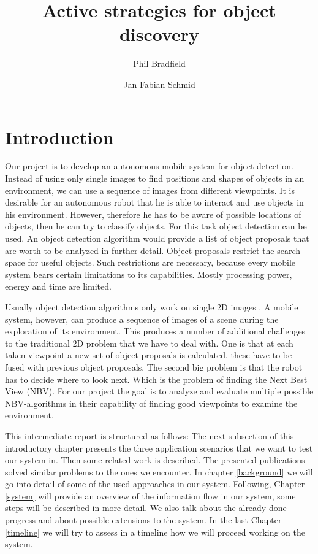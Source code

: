 \documentclass[a4paper,11pt,english]{article}
\begin{document}
\title{Active strategies for object discovery}
\author{Phil Bradfield \and Jan Fabian Schmid}
	
\maketitle 

\section{Introduction}
Our project is to develop an autonomous mobile system for object detection.
Instead of using only single images to find positions and shapes of objects in an environment, we can use a sequence of images from different viewpoints.
It is desirable for an autonomous robot that he is able to interact and use objects in his environment. However, therefore he has to be aware of possible locations of objects, then he can try to classify objects.
For this task object detection can be used. An object detection algorithm would provide a list of object proposals that are worth to be analyzed in further detail.
Object proposals restrict the search space for useful objects.
Such restrictions are necessary, because every mobile system bears certain limitations to its capabilities. 
Mostly processing power, energy and time are limited.

Usually object detection algorithms only work on single 2D images \cite{atanasov2014nonmyopic}.
A mobile system, however, can produce a sequence of images of a scene during the exploration of its environment.
This produces a number of additional challenges to the traditional 2D problem that we have to deal with.
One is that at each taken viewpoint a new set of object proposals is calculated, these have to be fused with previous object proposals. The second big problem is that the robot has to decide where to look next. Which is the problem of finding the Next Best View (NBV). 
For our project the goal is to analyze and evaluate multiple possible NBV-algorithms in their capability of finding good viewpoints to examine the environment.\medskip

This intermediate report is structured as follows:
The next subsection of this introductory chapter presents the three application scenarios that we want to test our system in.
Then some related work is described. The presented publications solved similar problems to the ones we encounter.
In chapter \ref{background} we will go into detail of some of the used approaches in our system.
Following, Chapter \ref{system} will provide an overview of the information flow in our system, some steps will be described in more detail. We also talk about the already done progress and about possible extensions to the system.
In the last Chapter \ref{timeline} we will try to assess in a timeline how we will proceed working on the system. 
 
\end{document}

